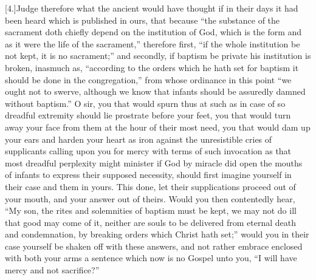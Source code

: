 [4.]Judge therefore what the ancient would have thought if in their days it had been heard which is published in ours, that because “the substance of the sacrament doth chiefly depend on the institution of God, which is the form and as it were the life of the sacrament,” therefore first, “if the whole institution be not kept, it is no sacrament;” and secondly, if baptism be private his institution is broken, inasmuch as, “according to the orders which he hath set for baptism it should be done in the congregation,” from whose ordinance in this point “we ought not to swerve, although we know that infants should be assuredly damned without baptism.” O sir, you that would spurn thus at such as in case of so dreadful extremity should lie prostrate before your feet, you that would turn away your face from them at the hour of their most need, you that would dam up your ears and harden your heart as iron against the unresistible cries of supplicants calling upon you for mercy with terms of such invocation as that most dreadful perplexity might minister if God by miracle did open the mouths of infants to express their supposed necessity, should first imagine yourself in their case and them in yours. This done, let their supplications proceed out of your mouth, and your answer out of theirs. Would you then contentedly hear, “My son, the rites and solemnities of baptism must be kept, we may not do ill that good may come of it, neither are souls to be delivered from eternal death and condemnation, by breaking orders which Christ hath set;” would you in their case yourself be shaken off with these answers, and not rather embrace enclosed  with both your arms a sentence which now is no Gospel unto you,
 “I will have mercy and not sacrifice?”

